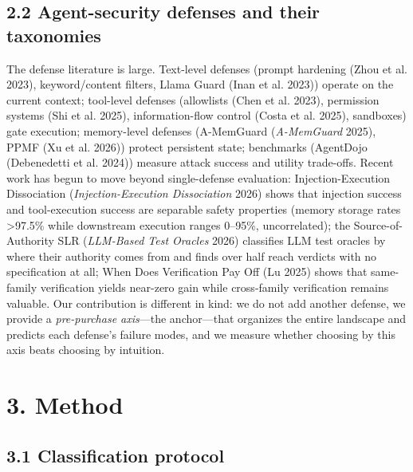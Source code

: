 \documentclass[11pt]{article}
\begin{document}
\subsection{2.2 Agent-security defenses and their taxonomies}\label{agent-security-defenses-and-their-taxonomies}

The defense literature is large. Text-level defenses (prompt hardening ({Zhou et al.} 2023), keyword/content filters, Llama Guard ({Inan et al.} 2023)) operate on the current context; tool-level defenses (allowlists ({Chen et al.} 2023), permission systems ({Shi et al.} 2025), information-flow control ({Costa et al.} 2025), sandboxes) gate execution; memory-level defenses (A-MemGuard (\emph{A-MemGuard} 2025), PPMF (Xu et al. 2026)) protect persistent state; benchmarks (AgentDojo (Debenedetti et al. 2024)) measure attack success and utility trade-offs. Recent work has begun to move beyond single-defense evaluation: Injection-Execution Dissociation (\emph{Injection-Execution Dissociation} 2026) shows that injection success and tool-execution success are separable safety properties (memory storage rates \textgreater97.5\% while downstream execution ranges 0--95\%, uncorrelated); the Source-of-Authority SLR (\emph{LLM-Based Test Oracles} 2026) classifies LLM test oracles by where their authority comes from and finds over half reach verdicts with no specification at all; When Does Verification Pay Off ({Lu} 2025) shows that same-family verification yields near-zero gain while cross-family verification remains valuable. Our contribution is different in kind: we do not add another defense, we provide a \emph{pre-purchase axis}---the anchor---that organizes the entire landscape and predicts each defense's failure modes, and we measure whether choosing by this axis beats choosing by intuition.

\section{3. Method}\label{method}

\subsection{3.1 Classification protocol}\label{classification-protocol}
\end{document}
